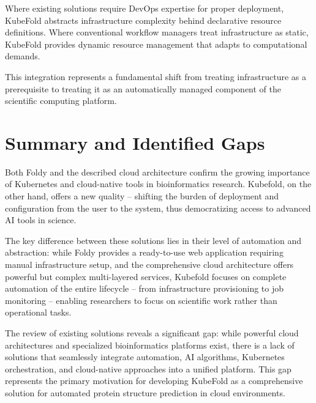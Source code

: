 Where existing solutions require DevOps expertise for proper deployment, KubeFold abstracts infrastructure complexity behind declarative resource definitions.
Where conventional workflow managers treat infrastructure as static, KubeFold provides dynamic resource management that adapts to computational demands.

This integration represents a fundamental shift from treating infrastructure as a prerequisite to treating it as an automatically managed component of the scientific computing platform.

\section{Summary and Identified Gaps}

Both Foldy and the described cloud architecture confirm the growing importance of Kubernetes and cloud-native tools in bioinformatics research.
Kubefold, on the other hand, offers a new quality -- shifting the burden of deployment and configuration from the user to the system, thus democratizing access to advanced AI tools in science.

The key difference between these solutions lies in their level of automation and abstraction: while Foldy provides a ready-to-use web application requiring manual infrastructure setup, and the comprehensive cloud architecture offers powerful but complex multi-layered services, Kubefold focuses on complete automation of the entire lifecycle -- from infrastructure provisioning to job monitoring -- enabling researchers to focus on scientific work rather than operational tasks.

The review of existing solutions reveals a significant gap: while powerful cloud architectures and specialized bioinformatics platforms exist, there is a lack of solutions that seamlessly integrate automation, AI algorithms, Kubernetes orchestration, and cloud-native approaches into a unified platform.
This gap represents the primary motivation for developing KubeFold as a comprehensive solution for automated protein structure prediction in cloud environments.

